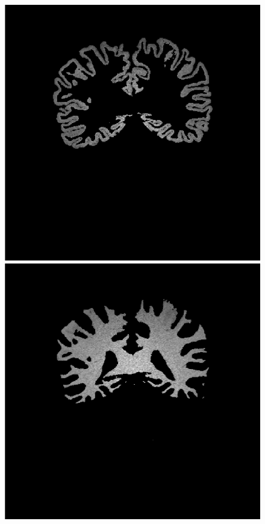 \begin{figure}[!h]
\begin{minipage}{0.17\linewidth}
                \includegraphics[width=\textwidth]{figures/gray_matter.png}
            \end{minipage}
            \begin{minipage}{0.17\linewidth}
                \includegraphics[width=\textwidth]{figures/white_matter.png}
            \end{minipage}
            

\end{figure}
